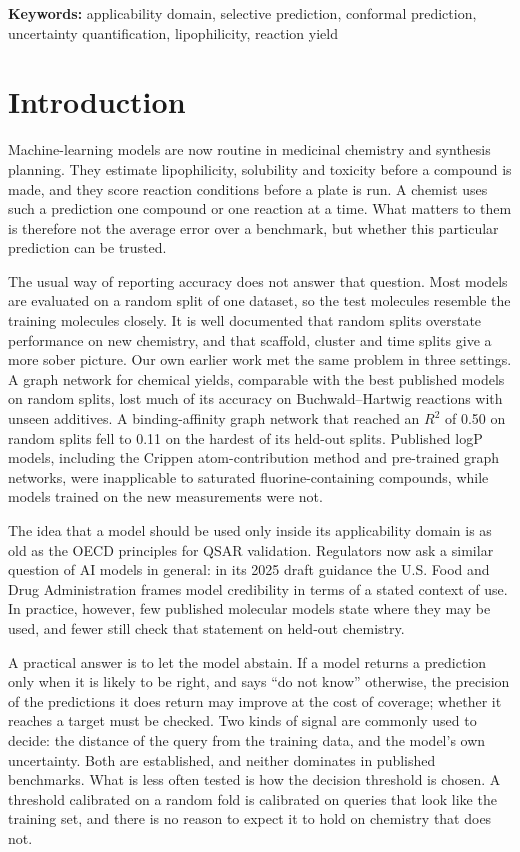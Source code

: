 \documentclass[11pt,letterpaper]{article}
\begin{document}
\noindent\textbf{Keywords:} applicability domain, selective prediction, conformal prediction, uncertainty quantification, lipophilicity, reaction yield

\section{Introduction}

Machine-learning models are now routine in medicinal chemistry and synthesis planning. They estimate lipophilicity, solubility and toxicity before a compound is made, and they score reaction conditions before a plate is run. A chemist uses such a prediction one compound or one reaction at a time. What matters to them is therefore not the average error over a benchmark, but whether this particular prediction can be trusted.

The usual way of reporting accuracy does not answer that question. Most models are evaluated on a random split of one dataset, so the test molecules resemble the training molecules closely. It is well documented that random splits overstate performance on new chemistry, and that scaffold, cluster and time splits give a more sober picture.\cite{sheridan2013,wallach2018,yang2019} Our own earlier work met the same problem in three settings. A graph network for chemical yields, comparable with the best published models on random splits, lost much of its accuracy on Buchwald--Hartwig reactions with unseen additives.\cite{yarish2023} A binding-affinity graph network that reached an $R^2$ of 0.50 on random splits fell to 0.11 on the hardest of its held-out splits.\cite{nikolaienko2022} Published logP models, including the Crippen atom-contribution method\cite{wildman1999} and pre-trained graph networks, were inapplicable to saturated fluorine-containing compounds, while models trained on the new measurements were not.\cite{gurbych2025}

The idea that a model should be used only inside its applicability domain is as old as the OECD principles for QSAR validation.\cite{oecd2007} Regulators now ask a similar question of AI models in general: in its 2025 draft guidance the U.S. Food and Drug Administration frames model credibility in terms of a stated context of use.\cite{fda2025} In practice, however, few published molecular models state where they may be used, and fewer still check that statement on held-out chemistry.

A practical answer is to let the model abstain. If a model returns a prediction only when it is likely to be right, and says ``do not know'' otherwise, the precision of the predictions it does return may improve at the cost of coverage; whether it reaches a target must be checked. Two kinds of signal are commonly used to decide: the distance of the query from the training data, and the model's own uncertainty. Both are established, and neither dominates in published benchmarks.\cite{hirschfeld2020,scalia2020} What is less often tested is how the decision threshold is chosen. A threshold calibrated on a random fold is calibrated on queries that look like the training set, and there is no reason to expect it to hold on chemistry that does not.
\end{document}
